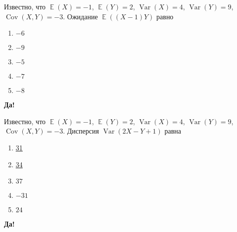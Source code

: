 \documentclass[t]{beamer}
\DeclareMathOperator{\Var}{Var}
\DeclareMathOperator{\Cov}{Cov}
\DeclareMathOperator{\E}{\mathbb{E}}
\begin{document}
 \begin{frame} \label{18-Yes} 
\begin{block}{18} 

Известно, что $\E(X)=-1$, $\E(Y)=2$, $\Var(X)=4$, $\Var(Y)=9$, $\Cov(X,Y)=-3$. Ожидание $\E((X-1)Y)$ равно

  


 \end{block} 
\begin{enumerate} 
\item[] \hyperlink{18-No}{\beamergotobutton{} $-6$}
\item[] \hyperlink{18-No}{\beamergotobutton{} $-9$}
\item[] \hyperlink{18-No}{\beamergotobutton{} $-5$}
\item[] \hyperlink{18-Yes}{\beamergotobutton{} $-7$}
\item[] \hyperlink{18-No}{\beamergotobutton{} $-8$}
\end{enumerate} 

 \textbf{Да!} 
 \hyperlink{19}{}\end{frame} 


 \begin{frame} \label{19-Yes} 
\begin{block}{19} 

Известно, что $\E(X)=-1$, $\E(Y)=2$, $\Var(X)=4$, $\Var(Y)=9$, $\Cov(X,Y)=-3$. Дисперсия $\Var(2X-Y+1)$ равна


 \end{block} 
\begin{enumerate} 
\item[] \hyperlink{19-No}{\beamergotobutton{} 31}
\item[] \hyperlink{19-No}{\beamergotobutton{} 34}
\item[] \hyperlink{19-Yes}{\beamergotobutton{} $37$}
\item[] \hyperlink{19-No}{\beamergotobutton{} $-31$}
\item[] \hyperlink{19-No}{\beamergotobutton{} $24$}
\end{enumerate} 

 \textbf{Да!} 
 \hyperlink{20}{}\end{frame} 
\end{document}
